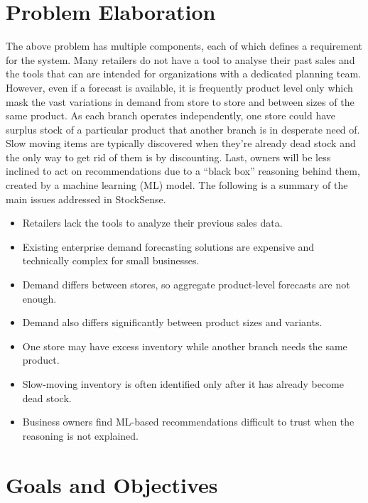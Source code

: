 \documentclass{StockSense}
\begin{document}
\section{Problem Elaboration}

The above problem has multiple components, each of which defines a requirement for the system. Many retailers do not have a tool to analyse their past sales and the tools that can are intended for organizations with a dedicated planning team. However, even if a forecast is available, it is frequently product level only which mask the vast variations in demand from store to store and between sizes of the same product. As each branch operates independently, one store could have surplus stock of a particular product that another branch is in desperate need of. Slow moving items are typically discovered when they're already dead stock and the only way to get rid of them is by discounting. Last, owners will be less inclined to act on recommendations due to a “black box” reasoning behind them, created by a machine learning (ML) model. The following is a summary of the main issues addressed in StockSense.

\begin{itemize}
    \item Retailers lack the tools to analyze their previous sales data.
    \item Existing enterprise demand forecasting solutions are expensive and technically complex for small businesses.
    \item Demand differs between stores, so aggregate product-level forecasts are not enough.
    \item Demand also differs significantly between product sizes and variants.
    \item One store may have excess inventory while another branch needs the same product.
    \item Slow-moving inventory is often identified only after it has already become dead stock.
    \item Business owners find ML-based recommendations difficult to trust when the reasoning is not explained.
\end{itemize}

\section{Goals and Objectives}
\end{document}
